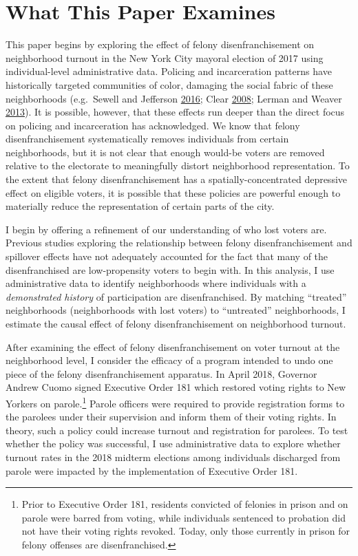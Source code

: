 \documentclass[12pt,]{article}
\let\rmarkdownfootnote\footnote%
\def\footnote{\protect\rmarkdownfootnote}
\begin{document}
\hypertarget{what-this-paper-examines}{%
\section{What This Paper Examines}\label{what-this-paper-examines}}

This paper begins by exploring the effect of felony disenfranchisement on neighborhood turnout in the New York City mayoral election of 2017 using individual-level administrative data. Policing and incarceration patterns have historically targeted communities of color, damaging the social fabric of these neighborhoods (e.g.~Sewell and Jefferson \protect\hyperlink{ref-Sewell2016}{2016}; Clear \protect\hyperlink{ref-Clear2008}{2008}; Lerman and Weaver \protect\hyperlink{ref-Lerman2013}{2013}). It is possible, however, that these effects run deeper than the direct focus on policing and incarceration has acknowledged. We know that felony disenfranchisement systematically removes individuals from certain neighborhoods, but it is not clear that enough would-be voters are removed relative to the electorate to meaningfully distort neighborhood representation. To the extent that felony disenfranchisement has a spatially-concentrated depressive effect on eligible voters, it is possible that these policies are powerful enough to materially reduce the representation of certain parts of the city.

I begin by offering a refinement of our understanding of who lost voters are. Previous studies exploring the relationship between felony disenfranchisement and spillover effects have not adequately accounted for the fact that many of the disenfranchised are low-propensity voters to begin with. In this analysis, I use administrative data to identify neighborhoods where individuals with a \emph{demonstrated history} of participation are disenfranchised. By matching ``treated'' neighborhoods (neighborhoods with lost voters) to ``untreated'' neighborhoods, I estimate the causal effect of felony disenfranchisement on neighborhood turnout.

After examining the effect of felony disenfranchisement on voter turnout at the neighborhood level, I consider the efficacy of a program intended to undo one piece of the felony disenfranchisement apparatus. In April 2018, Governor Andrew Cuomo signed Executive Order 181 which restored voting rights to New Yorkers on parole.\footnote{Prior to Executive Order 181, residents convicted of felonies in prison and on parole were barred from voting, while individuals sentenced to probation did not have their voting rights revoked. Today, only those currently in prison for felony offenses are disenfranchised.} Parole officers were required to provide registration forms to the parolees under their supervision and inform them of their voting rights. In theory, such a policy could increase turnout and registration for parolees. To test whether the policy was successful, I use administrative data to explore whether turnout rates in the 2018 midterm elections among individuals discharged from parole were impacted by the implementation of Executive Order 181.
\end{document}
